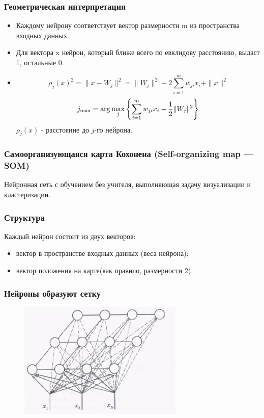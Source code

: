 \documentclass[aspectratio=169]{beamer}
\begin{document}
\begin{frame}
  \frametitle{Геометрическая интерпретация}
  \begin{itemize}
    \item Каждому нейрону соответствует вектор размерности m из пространства
    входных данных.
    \item Для вектора x нейрон, который ближе всего по евклидову расстоянию,
    выдаст 1, остальные 0.
    \item
    \[
      \rho_{j}(x)^{2}=\|x-W_{j}\|^{2}=\|W_{j}\|^{2}-2\sum _{{i=1}}^{m}w_{{ji}}x_{i}+\|x\|^{2}
    \]
    \[
      j_{\max }={\rm {arg}}\max _{j}\left\{\sum _{i=1}^{m}w_{ji}x_{i}-{\frac {1}{2}}\|W_{j}\|^{2}\right\}
    \]
    $\rho_{j}(x)$ - расстояние до $j$-го нейрона. 
  
  \end{itemize}
\end{frame}

\begin{frame}
  \frametitle{Самоорганизующаяся карта Кохонена (Self-organizing map — SOM)}
  Нейронная сеть с обучением без учителя,
  выполняющая задачу визуализации и кластеризации.
\end{frame}

\begin{frame}
  \frametitle{Структура}
  Каждый нейрон состоит из двух векторов:
  \begin{itemize}
    \item вектор в пространстве входных данных (веса нейрона);
    \item вектор положения на карте(как правило, размерности 2).
  \end{itemize}
\end{frame}

\begin{frame}
  \frametitle{Нейроны образуют сетку}
    \begin{figure}
      \centering
      \includegraphics[width=0.7\textwidth]{structure.png}
    \end{figure}

\end{frame}
\end{document}
